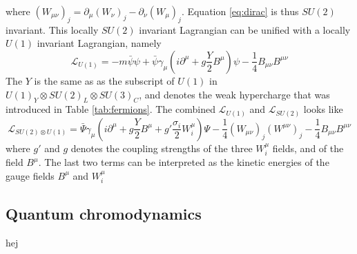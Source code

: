 where $(W_{\mu\nu})_{j}=\partial_{\mu}(W_{\nu})_{j}-\partial_{\nu}(W_{\mu})_{j}$. 
Equation \ref{eq:dirac} is thus $SU(2)$ invariant.  
This locally $SU(2)$ invariant Lagrangian can be unified with a locally $U(1)$ invariant Lagrangian, namely
\begin{equation}
\mathcal{L}_{U(1)}=-m\bar{\psi}\psi+\bar{\psi}\gamma_{\mu}(i\partial^{\mu}+g\frac{Y}{2}B^{\mu})\psi-\frac{1}{4}B_{\mu\nu}B^{\mu\nu}
\end{equation}                                               
The $Y$ is the same as as the subscript of $U(1)$ in $U(1)_{Y}\otimes SU(2)_{L}\otimes SU(3)_{C}$, and denotes the weak hypercharge that was introduced in Table \ref{tab:fermions}. 
The combined $\mathcal{L}_{U(1)}$ and $\mathcal{L}_{SU(2)}$ looks like
\begin{equation}
\mathcal{L}_{SU(2)\otimes U(1)}=\bar{\Psi}\gamma_{\mu}(i\partial^{\mu}+g\frac{Y}{2}B^{\mu}+g'\frac{\sigma_{i}}{2}W_{i}^{\mu})\Psi-\frac{1}{4}(W_{\mu\nu})_{j}(W^{\mu\nu})_{j}-\frac{1}{4}B_{\mu\nu}B^{\mu\nu} 
\end{equation}                                                
where $g'$ and $g$ denotes the coupling strengths of the three $W_{i}^{\mu}$ fields, and of the field $B^{\mu}$. The last two terms can be interpreted as the kinetic energies of the gauge fields $B^{\mu}$ and $W_{i}^{\mu}$
\subsection*{Quantum chromodynamics} 
\noindent\justify
hej
